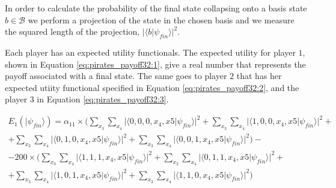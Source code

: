In order to calculate the probability of the final state collapsing onto a basis state $b \in \mathcal{B}$ we perform a projection of the state in the chosen basis and we measure the squared length of the projection, $\vert\langle b\vert\psi_{fin}\rangle\vert^{2}$\cite{Trueblood}.

Each player has an expected utility functionals. The expected utility for player $1$, shown in Equation \ref{eq:pirates_payoff32:1}, give a real number that represents the payoff associated with a final state. The same goes to player $2$ that has her expected utiity functional specified in Equation \ref{eq:pirates_payoff32:2}, and the player $3$ in Equation \ref{eq:pirates_payoff32:3}.

 
\begin{equation}
\begin{split}
E_{1}(\vert\psi_{fin}\rangle)=\alpha_{11}\times(\sum_{x_{3}}\sum_{x_{4}}\vert\langle0,0,0,x_{4},x{5}\vert\psi_{fin}\rangle\vert^{2} + \sum_{x_{3}}\sum_{x_{4}}\vert\langle1,0,0,x_{4},x{5}\vert\psi_{fin}\rangle\vert^{2} + \\ 
+ \sum_{x_{3}}\sum_{x_{4}}\vert\langle0,1,0,x_{4},x{5}\vert\psi_{fin}\rangle\vert^{2}
+ \sum_{x_{3}}\sum_{x_{4}}\vert\langle0,0,1,x_{4},x{5}\vert\psi_{fin}\rangle\vert^{2}
 ) - \\ 
 - 200\times(\sum_{x_{3}}\sum_{x_{4}}\vert\langle1,1,1,x_{4},x{5}\vert\psi_{fin}\rangle\vert^{2} + \sum_{x_{3}}\sum_{x_{4}}\vert\langle0,1,1,x_{4},x{5}\vert\psi_{fin}\rangle\vert^{2} + \\ 
+ \sum_{x_{3}}\sum_{x_{4}}\vert\langle1,0,1,x_{4},x{5}\vert\psi_{fin}\rangle\vert^{2}
+ \sum_{x_{3}}\sum_{x_{4}}\vert\langle1,1,0,x_{4},x{5}\vert\psi_{fin}\rangle\vert^{2}
 ) 
\end{split}
\label{eq:pirates_payoff32:1}
\end{equation}

